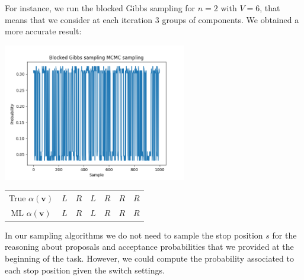 \documentclass[]{article}
\begin{document}
For instance, we run the blocked Gibbs sampling for $n=2$ with $V=6$, that means that we consider at each iteration 3 groups of components. We obtained a more accurate result:
\begin{center}
	\includegraphics[height=6cm]{task3/V_6_T_6_N_10000_Blocked_Gibbs.png}
	\begin{tabular}{| c | c | c | c | c | c | c |}
		True $\alpha(\mathbf{v})$ & $L$ & $R$ & $L$ & $R$ & $R$ & $R$ \\
		ML $\alpha(\mathbf{v})$ & $L$ & $R$ & $L$ & $R$ & $R$ & $R$ \\
	\end{tabular}
\end{center}

In our sampling algorithms we do not need to sample the stop position $s$ for the reasoning about proposals and acceptance probabilities that we provided at the beginning of the task. However, we could compute the probability associated to each stop position given the switch settings. 
\end{document}

